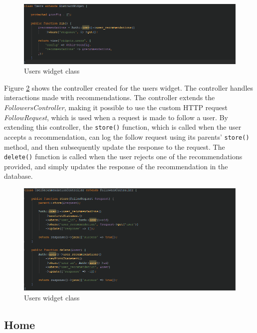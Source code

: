 \begin{figure}[H]
\centering
\includegraphics[width=1\textwidth]{Images/Implementation/UsersWidget}
\caption{Users widget class}
\label{fig:UsersWidget}
\end{figure}

Figure \ref{fig:UserRecommendationsController} shows the controller created for the users widget. The controller handles interactions made with recommendations. The controller extends the \textit{FollowersController}, making it possible to use the custom HTTP request \textit{FollowRequest}, which is used when a request is made to follow a user. By extending this controller, the \texttt{store()} function, which is called when the user accepts a recommendation, can log the follow request using its parents' \texttt{store()} method, and then subsequently update the response to the request. The \texttt{delete()} function is called when the user rejects one of the recommendations provided, and simply updates the response of the recommendation in the database.

\begin{figure}[H]
\centering
\includegraphics[width=1\textwidth]{Images/Implementation/UserRecommendationsController}
\caption{Users widget class}
\label{fig:UserRecommendationsController}
\end{figure}

\subsection{Home}
